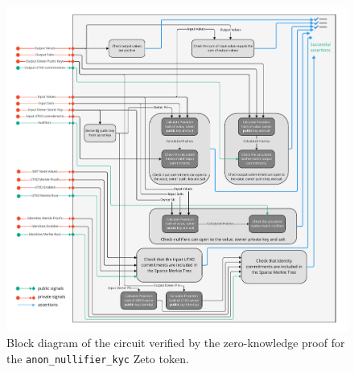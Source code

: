 \begin{figure}
\centering
\includegraphics[width=\linewidth]{anon_nullifier_kyc.pdf}
\caption{Block diagram of the circuit verified by the zero-knowledge proof for the \texttt{anon\_nullifier\_kyc} Zeto token.}\label{fig:zeto_circuit}
\end{figure}

